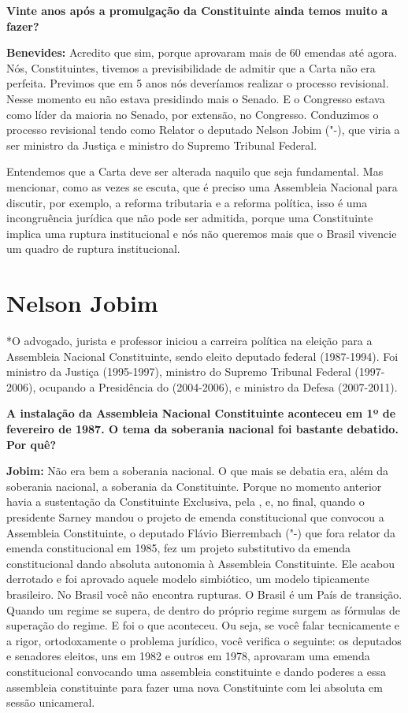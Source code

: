 \textbf{Vinte anos após a promulgação da Constituinte ainda temos muito
a fazer?}

\textbf{Benevides:} Acredito que sim, porque aprovaram mais de 60
emendas até agora. Nós, Constituintes, tivemos a previsibilidade de
admitir que a Carta não era perfeita. Previmos que em 5 anos nós
deveríamos realizar o processo revisional. Nesse momento eu não estava
presidindo mais o Senado. E o Congresso estava como líder da maioria no
Senado, por extensão, no Congresso. Conduzimos o processo revisional
tendo como Relator o deputado Nelson Jobim ("-), que viria a ser
ministro da Justiça e ministro do Supremo Tribunal Federal.

Entendemos que a Carta deve ser alterada naquilo que seja fundamental.
Mas mencionar, como as vezes se escuta, que é preciso uma Assembleia
Nacional para discutir, por exemplo, a reforma tributaria e a reforma
política, isso é uma incongruência jurídica que não pode ser admitida,
porque uma Constituinte implica uma ruptura institucional e nós não
queremos mais que o Brasil vivencie um quadro de ruptura institucional.

\chapter{Nelson Jobim}

*O advogado, jurista e professor iniciou a carreira política na eleição
para a Assembleia Nacional Constituinte, sendo eleito deputado federal
(1987-1994). Foi ministro da Justiça (1995-1997), ministro do Supremo
Tribunal Federal (1997-2006), ocupando a Presidência do  (2004-2006),
e ministro da Defesa (2007-2011).

\textbf{A instalação da Assembleia Nacional Constituinte aconteceu em 1º
de fevereiro de 1987. O tema da soberania nacional foi bastante
debatido. Por quê?}

\textbf{Jobim:} Não era bem a soberania nacional. O que mais se debatia
era, além da soberania nacional, a soberania da Constituinte. Porque no
momento anterior havia a sustentação da Constituinte Exclusiva, pela
, e, no final, quando o presidente Sarney mandou o projeto de emenda
constitucional que convocou a Assembleia Constituinte, o deputado Flávio
Bierrembach ("-) que fora relator da emenda constitucional em 1985,
fez um projeto substitutivo da emenda constitucional dando absoluta
autonomia à Assembleia Constituinte. Ele acabou derrotado e foi aprovado
aquele modelo simbiótico, um modelo tipicamente brasileiro. No Brasil
você não encontra rupturas. O Brasil é um País de transição. Quando um
regime se supera, de dentro do próprio regime surgem as fórmulas de
superação do regime. E foi o que aconteceu. Ou seja, se você falar
tecnicamente e a rigor, ortodoxamente o problema jurídico, você verifica
o seguinte: os deputados e senadores eleitos, uns em 1982 e outros em
1978, aprovaram uma emenda constitucional convocando uma assembleia
constituinte e dando poderes a essa assembleia constituinte para fazer
uma nova Constituinte com lei absoluta em sessão unicameral.

